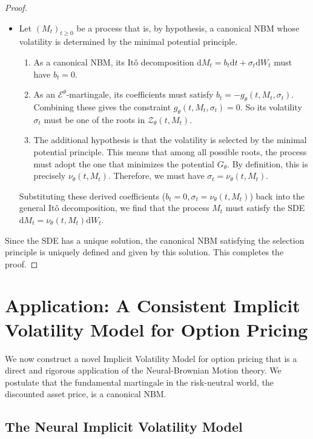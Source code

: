 \documentclass[qian]{imsart}
\newcommand{\cEneutheta}{\mathcal{E}^{\theta}}
\newcommand{\dd}{\mathrm{d}}
\theoremstyle{plain}
\theoremstyle{definition}
\begin{document}
\begin{proof}
\begin{itemize}
    \item[\textbf{($\implies$) Necessity:}] Let $(M_t)_{t \ge 0}$ be a process that is, by hypothesis, a canonical NBM whose volatility is determined by the minimal potential principle.
    \begin{enumerate}
        \item As a canonical NBM, its Itô decomposition $\dd M_t = b_t \dd t + \sigma_t \dd W_t$ must have $b_t = 0$.
        \item As an $\cEneutheta$-martingale, its coefficients must satisfy $b_t = -g_\theta(t, M_t, \sigma_t)$. Combining these gives the constraint $g_\theta(t, M_t, \sigma_t) = 0$. So its volatility $\sigma_t$ must be one of the roots in $\mathcal{Z}_\theta(t, M_t)$.
        \item The additional hypothesis is that the volatility is selected by the minimal potential principle. This means that among all possible roots, the process must adopt the one that minimizes the potential $G_\theta$. By definition, this is precisely $\nu_\theta(t, M_t)$. Therefore, we must have $\sigma_t = \nu_\theta(t, M_t)$.
    \end{enumerate}
    Substituting these derived coefficients ($b_t=0, \sigma_t=\nu_\theta(t, M_t)$) back into the general Itô decomposition, we find that the process $M_t$ must satisfy the SDE $\dd M_t = \nu_\theta(t, M_t) \dd W_t$.
\end{itemize}
Since the SDE has a unique solution, the canonical NBM satisfying the selection principle is uniquely defined and given by this solution. This completes the proof.
\end{proof}



\section{Application: A Consistent Implicit Volatility Model for Option Pricing}
\label{sec:application}

We now construct a novel Implicit Volatility Model for option pricing that is a direct and rigorous application of the Neural-Brownian Motion theory. We postulate that the fundamental martingale in the risk-neutral world, the discounted asset price, is a canonical NBM.

\subsection{The Neural Implicit Volatility Model}
\end{document}
